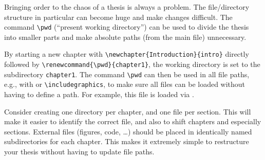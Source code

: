 
Bringing order to the chaos of a thesis is always a problem. The file/directory structure in particular can become huge and make changes difficult. The command \verb|\pwd| (``present working directory'') can be used to divide the thesis into smaller parts and make absolute paths (from the main file) unnecessary.

By starting a new chapter with \verb|\newchapter{Introduction}{intro}| directly followed by \linebreak%
\verb|\renewcommand{\pwd}{chapter1}|, the working directory is set to the subdirectory \verb|chapter1|. The command \verb|\pwd| can then be used in all file paths, e.g., with \verb|| or \verb|\includegraphics|, to make sure all files can be loaded without having to define a path. For example, this file is loaded via \verb||.

Consider creating one directory per chapter, and one file per section. This will make it easier to identify the correct file, and also to shift chapters and especially sections. External files (figures, code, \dots) should be placed in identically named subdirectories for each chapter. This makes it extremely simple to restructure your thesis without having to update file paths.





